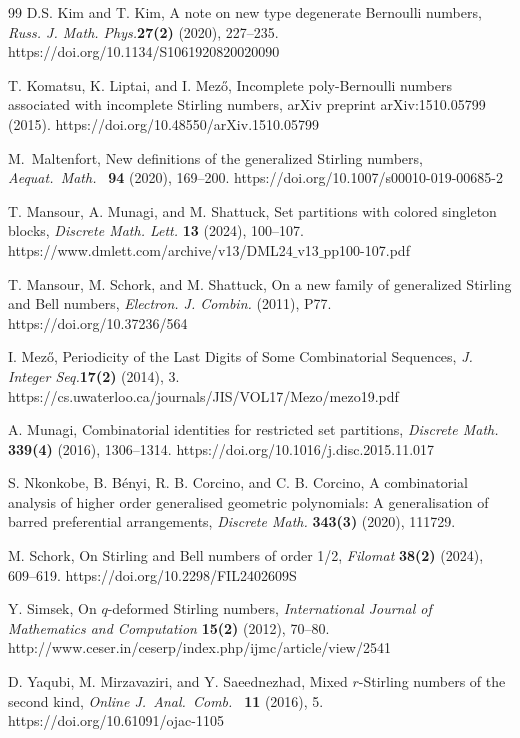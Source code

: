 \documentclass[12pt, reqno]{amsart}
\newtheorem{proof 1}{proof 1}
\begin{document}
\begin{thebibliography}{99}
  D.S. Kim and T. Kim, A note on new type degenerate Bernoulli numbers, \textit{Russ. J. Math. Phys.}\textbf{27(2)} (2020), 227--235. https://doi.org/10.1134/S1061920820020090
 	
  T. Komatsu, K. Liptai, and I. Mező, Incomplete poly-Bernoulli numbers associated with incomplete Stirling numbers, arXiv preprint arXiv:1510.05799 (2015). https://doi.org/10.48550/arXiv.1510.05799

 M.~Maltenfort, New definitions of the generalized Stirling numbers, \textit{Aequat.~Math.~} \textbf{94} (2020), 169--200. https://doi.org/10.1007/s00010-019-00685-2

  T. Mansour, A. Munagi, and M. Shattuck, Set partitions with colored singleton blocks, \textit{Discrete Math. Lett.} \textbf{13} (2024), 100--107. https://www.dmlett.com/archive/v13/DML24$\_$v13$\_$pp100-107.pdf

 
  T. Mansour, M. Schork, and M. Shattuck, On a new family of generalized Stirling and Bell numbers, \textit{Electron. J. Combin.} (2011), P77. https://doi.org/10.37236/564

  I. Mező, Periodicity of the Last Digits of Some Combinatorial Sequences,  \textit{J. Integer Seq.}\textbf{17(2)} (2014), 3. https://cs.uwaterloo.ca/journals/JIS/VOL17/Mezo/mezo19.pdf
 

  A. Munagi, Combinatorial identities for restricted set partitions, \textit{Discrete Math.} \textbf{339(4)} (2016), 1306--1314. https://doi.org/10.1016/j.disc.2015.11.017
 
  S. Nkonkobe, B. Bényi, R. B. Corcino, and C. B. Corcino, A combinatorial analysis of higher order generalised geometric polynomials: A generalisation of barred preferential arrangements, \textit{Discrete Math.} \textbf{343(3)} (2020), 111729.
 
  M. Schork, On Stirling and Bell numbers of order 1/2, \textit{Filomat} \textbf{38(2)} (2024), 609--619. https://doi.org/10.2298/FIL2402609S


  Y. Simsek, On $q$-deformed Stirling numbers,  \textit{International Journal of Mathematics and Computation} \textbf{15(2)} (2012), 70--80. http://www.ceser.in/ceserp/index.php/ijmc/article/view/2541
 

 D. Yaqubi, M. Mirzavaziri, and Y. Saeednezhad, Mixed $r$-Stirling numbers of the second kind, \textit{Online J.~Anal.~Comb.~} \textbf{11} (2016), 5. https://doi.org/10.61091/ojac-1105

 \end{thebibliography}
\end{document}
